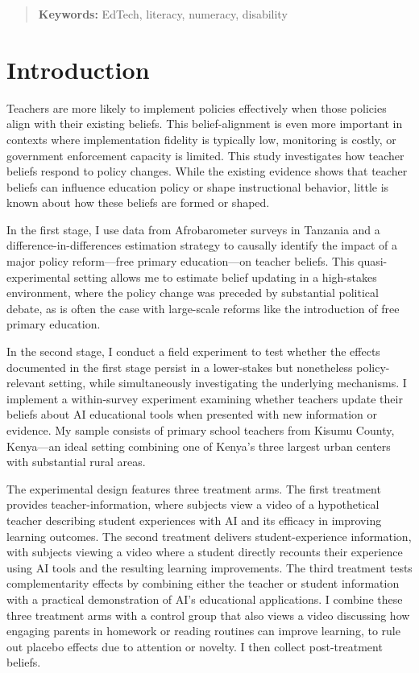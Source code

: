 \documentclass[hidelinks,12pt]{article}
\begin{document}
\begin{singlespace}
\begin{titlepage}
\begin{abstract}
\textbf{Keywords:} EdTech, literacy, numeracy, disability \\

\bigskip
\end{abstract}
\setcounter{page}{0}
\thispagestyle{empty}
\end{titlepage}
\pagebreak \newpage

\onehalfspacing

\section{Introduction} \label{sec:introduction} %
Teachers are more likely to implement policies effectively when those policies align with their existing beliefs. This belief-alignment is even more important in contexts where implementation fidelity is typically low, monitoring is costly, or government enforcement capacity is limited. This study investigates how teacher beliefs respond to policy changes. While the existing evidence shows that teacher beliefs can influence education policy or shape instructional behavior, little is known about how these beliefs are formed or shaped.

In the first stage, I use data from Afrobarometer surveys in Tanzania and a difference-in-differences estimation strategy to causally identify the impact of a major policy reform—free primary education—on teacher beliefs. This quasi-experimental setting allows me to estimate belief updating in a high-stakes environment, where the policy change was preceded by substantial political debate, as is often the case with large-scale reforms like the introduction of free primary education.

In the second stage, I conduct a field experiment to test whether the effects documented in the first stage persist in a lower-stakes but nonetheless policy-relevant setting, while simultaneously investigating the underlying mechanisms. I implement a within-survey experiment examining whether teachers update their beliefs about AI educational tools when presented with new information or evidence. My sample consists of primary school teachers from Kisumu County, Kenya—an ideal setting combining one of Kenya's three largest urban centers with substantial rural areas.

The experimental design features three treatment arms. The first treatment provides teacher-information, where subjects view a video of a hypothetical teacher describing student experiences with AI and its efficacy in improving learning outcomes. The second treatment delivers student-experience information, with subjects viewing a video where a student directly recounts their experience using AI tools and the resulting learning improvements. The third treatment tests complementarity effects by combining either the teacher or student information with a practical demonstration of AI's educational applications. I combine these three treatment arms with a control group that also views a video discussing how engaging parents in homework or reading routines can improve learning, to rule out placebo effects due to attention or novelty. I then collect post-treatment beliefs.


\end{singlespace}
\end{document}
